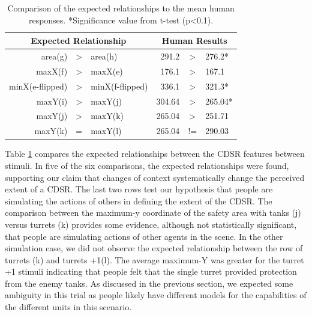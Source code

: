 \documentclass[11pt,letterpaper]{article}
\begin{document}
\begin{table}[htb]
\begin{center}
\begin{tabular}{r c l r c l}
\multicolumn{3}{c}{Expected Relationship} & \multicolumn{3}{c}{Human Results}  \\
\hline
\hline
area(g) &>& area(h) & 291.2 & >& 276.2* \\
maxX(f) &>& maxX(e) & 176.1& >& 167.1 \\
minX(e-flipped) &>& minX(f-flipped) & 336.1& >& 321.3* \\
maxY(i) &>& maxY(j) & 304.64 &>& 265.04* \\
maxY(j) &>& maxY(k) & 265.04 &>& 251.71 \\
maxY(k) &=& maxY(l) & 265.04 &!=& 290.03 \\
\hline
\end{tabular}
\end{center}
\caption{Comparison of the expected relationships to the mean human responses. *Significance value from t-test (p<0.1).}
\label{tab:region-location-tests}
\end{table}


Table \ref{tab:region-location-tests} compares the expected relationships between the CDSR features between stimuli.  In five of the six comparisons, the expected relationships were found, supporting our claim that changes of context systematically change the perceived extent of a CDSR.  The last two rows test our hypothesis that people are simulating the actions of others in defining the extent of the CDSR.  The comparison between the maximum-y coordinate of the safety area with tanks (j) versus turrets (k) provides some evidence, although not statistically significant, that people are simulating actions of other agents in the scene.  In the other simulation case, we did not observe the expected relationship between the row of turrets (k) and turrets +1(l).  The average maximum-Y was greater for the turret +1 stimuli indicating that people felt that the single turret provided protection from the enemy tanks.  As discussed in the previous section, we expected some ambiguity in this trial as people likely have different models for the capabilities of the different units in this scenario.


\end{document}
